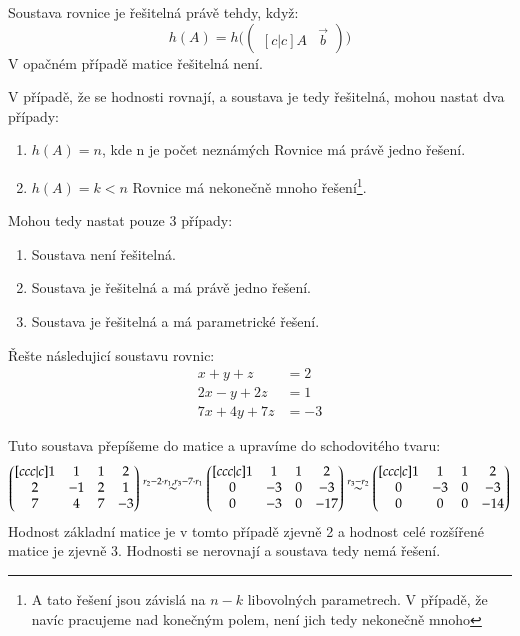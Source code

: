 Soustava rovnice je řešitelná právě tehdy, když:
\[
    h(A) = h\Bigg (
    \begin{pmatrix}[c|c]
        A & \vec{b}
    \end{pmatrix} \Bigg )
\]
V opačném případě matice řešitelná není.

V případě, že se hodnosti rovnají, a soustava je tedy řešitelná, mohou nastat dva případy:
\begin{enumerate}
    \item $h(A) = n$, kde n je počet neznámých \hfill Rovnice má právě jedno řešení.
    \item $h(A) = k < n$ \hfill Rovnice má nekonečně mnoho řešení\footnote{A tato řešení jsou
    závislá na $n-k$ libovolných parametrech. V případě, že navíc pracujeme nad konečným polem, není jich
    tedy nekonečně mnoho}.
\end{enumerate}
Mohou tedy nastat pouze 3 případy:
\begin{enumerate}
    \item Soustava není řešitelná.
    \item Soustava je řešitelná a má právě jedno řešení.
    \item Soustava je řešitelná a má parametrické řešení.
\end{enumerate}

\begin{example}
    Řešte následujicí soustavu rovnic:
    \begin{align*}
        x + y + z &= 2 \\
        2x - y + 2z &= 1 \\
        7x + 4y + 7z &= -3
    \end{align*}

    Tuto soustava přepíšeme do matice a upravíme do schodovitého tvaru:
    \[
        \begin{pmatrix}[ccc|c]
            1 & 1 & 1 & 2 \\
            2 & -1 & 2 & 1 \\
            7 & 4 & 7 & -3
        \end{pmatrix} \overset{r_2 - 2\cdot r_1, r_3 - 7\cdot r_1} \sim
        \begin{pmatrix}[ccc|c]
            1 & 1 & 1 & 2 \\
            0 & -3 & 0 & -3 \\
            0 & -3 & 0 & -17
        \end{pmatrix} \overset{r_3 - r_2} \sim
        \begin{pmatrix}[ccc|c]
            1 & 1 & 1 & 2 \\
            0 & -3 & 0 & -3 \\
            0 & 0 & 0 & -14
        \end{pmatrix}
    \]
    Hodnost základní matice je v tomto případě zjevně 2 a hodnost
    celé rozšířené matice je zjevně 3. Hodnosti se nerovnají a soustava tedy nemá řešení.
\end{example}
